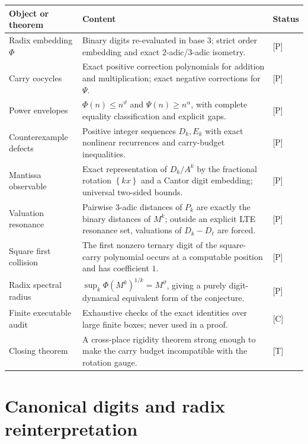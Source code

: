 \documentclass[11pt]{article}
\theoremstyle{definition}
\theoremstyle{remark}
\newcommand{\fracpart}[1]{\left\{#1\right\}}
\newcommand{\PhiMap}{\Phi}
\newcommand{\PsiMap}{\Psi}
\newcommand{\thetaAE}{\vartheta}
\newcommand{\alphaAE}{\alpha}
\newcommand{\evidence}[1]{\textsf{[#1]}}
\begin{document}
\begin{longtable}{>{\raggedright\arraybackslash}p{}
                  >{\raggedright\arraybackslash}p{}
                  >{\centering\arraybackslash}p{}}
\toprule
Object or theorem & Content & Status\\
\midrule
\endhead
Radix embedding $\PhiMap$ & Binary digits re-evaluated in base $3$; strict
order embedding and exact $2$-adic/$3$-adic isometry. & \evidence{P}\\
Carry cocycles & Exact positive correction polynomials for addition and
multiplication; exact negative corrections for $\PsiMap$. & \evidence{P}\\
Power envelopes & $\PhiMap(n)\le n^{\thetaAE}$ and
$\PsiMap(n)\ge n^{\alphaAE}$, with complete equality classification and
explicit gaps. & \evidence{P}\\
Counterexample defects & Positive integer sequences $D_k,E_k$ with exact
nonlinear recurrences and carry-budget inequalities. & \evidence{P}\\
Mantissa observable & Exact representation of $D_k/A^k$ by the fractional
rotation $\fracpart{kx}$ and a Cantor digit embedding; universal two-sided
bounds. & \evidence{P}\\
Valuation resonance & Pairwise $3$-adic distances of $P_k$ are exactly the
binary distances of $M^k$; outside an explicit LTE resonance set, valuations
of $D_k-D_\ell$ are forced. & \evidence{P}\\
Square first collision & The first nonzero ternary digit of the square-carry
polynomial occurs at a computable position and has coefficient $1$. &
\evidence{P}\\
Radix spectral radius & $\sup_k\PhiMap(M^k)^{1/k}=M^{\thetaAE}$, giving a
purely digit-dynamical equivalent form of the conjecture. & \evidence{P}\\
Finite executable audit & Exhaustive checks of the exact identities over
large finite boxes; never used in a proof. & \evidence{C}\\
Closing theorem & A cross-place rigidity theorem strong enough to make the
carry budget incompatible with the rotation gauge. & \evidence{T}\\
\bottomrule
\end{longtable}

\section{Canonical digits and radix reinterpretation}
\end{document}
